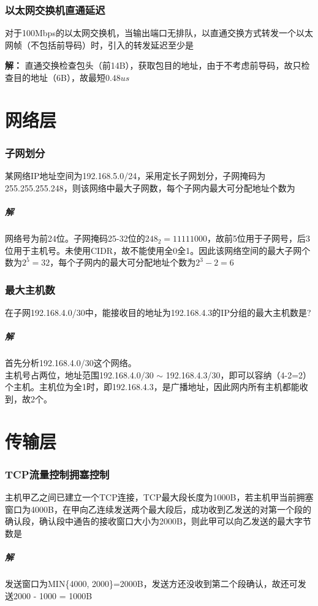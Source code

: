 \subsubsection{以太网交换机直通延迟}
对于100Mbps的以太网交换机，当输出端口无排队，以直通交换方式转发一个以太网帧（不包括前导码）时，引入的转发延迟至少是

\textbf{解：}
直通交换检查包头（前14B），获取包目的地址，由于不考虑前导码，故只检查目的地址（6B），故最短\(0.48us\)


\section{网络层}

\subsubsection{子网划分}
某网络IP地址空间为192.168.5.0/24，采用定长子网划分，子网掩码为255.255.255.248，则该网络中最大子网数，每个子网内最大可分配地址个数为

\subparagraph{解}
网络号为前24位。子网掩码25-32位的\(248_2 = 11111000\)，故前5位用于子网号，后3位用于主机号。未使用CIDR，故不能使用全0全1。因此该网络空间的最大子网个数为\(2^5 = 32\)，每个子网内的最大可分配地址个数为\(2^3 - 2 = 6\)


\subsubsection{最大主机数}
在子网192.168.4.0/30中，能接收目的地址为192.168.4.3的IP分组的最大主机数是?

\subparagraph{解}
首先分析192.168.4.0/30这个网络。 \\
主机号占两位，地址范围192.168.4.0/30 \(\sim\) 192.168.4.3/30，即可以容纳（4-2=2）个主机。主机位为全1时，即192.168.4.3，是广播地址，因此网内所有主机都能收到，故2个。


\section{传输层}

\subsubsection{TCP流量控制拥塞控制}
主机甲乙之间已建立一个TCP连接，TCP最大段长度为1000B，若主机甲当前拥塞窗口为4000B，在甲向乙连续发送两个最大段后，成功收到乙发送的对第一个段的确认段，确认段中通告的接收窗口大小为2000B，则此甲可以向乙发送的最大字节数是

\subparagraph{解}
发送窗口为MIN\{4000, 2000\}=2000B，发送方还没收到第二个段确认，故还可发送2000 - 1000 = 1000B


